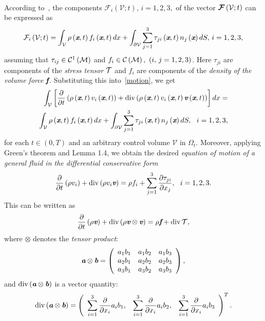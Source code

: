 \paragraph{}
According to~\cite{1993}, the components $\mathcal{F}_i\left(\mathcal{V};t\right),\,i=1, 2, 3,$ of the vector $\boldsymbol{\mathcal{F}}\left(\mathcal{V};t\right)$ can be expressed as
\begin{equation}
\mathcal{F}_i\left(\mathcal{V};t\right) = \int_{\mathcal{V}}\rho\left(\textit{\textbf{x}},t\right)f_i\left(\textit{\textbf{x}},t\right)dx + \int_{\partial\mathcal{V}}\sum_{j=1}^3\tau_{ji}\left(\textit{\textbf{x}},t\right)n_j\left(\textit{\textbf{x}}\right)dS,\,i = 1,2,3,
\end{equation}
assuming that $\tau_{ij}\in\mathcal{C}^1\left({}\mathcal{M}\right) $ and $f_i\in\mathcal{C}\left({}\mathcal{M}\right),\ \left({}i,\,j=1, 2, 3\right) $. Here $\tau_{ji}$ are components of the \textit{stress tensor} $\mathcal{T}$ and $f_i$ are components of the \textit{density of the volume force} $\textit{\textbf{f}}$.
Substituting this into~\eqref{motion},
we get
\begin{eqnarray}
\int_{\mathcal{V}}\left[\pds{}{t}\left(\rho\left(\bs{x},t\right)v_i\left(\bs{x},t\right)\right)+\mathrm{div}\left(\rho\left(\bs{x},t\right)v_i\left(\bs{x},t\right)\bs{v}\left(\bs{x},t\right)\right)\right]dx= \\
\int_{\mathcal{V}}\rho\left(\bs{x},t\right)f_i\left(\bs{x},t\right)dx + \int_{\partial\mathcal{V}}\sum_{j=1}^3\tau_{ji}\left(\bs{x},t\right)n_j\left(\bs{x}\right)dS,\ \ i = 1,2,3,
\end{eqnarray}
for each $t\in\left(0,T\right)$ and an arbitrary control volume $\mathcal{V}$ in $\Omega_t$.
Moreover, applying Green's theorem and Lemma 1.4, we obtain the desired \textit{equation of motion of a general fluid in the differential conservative form}
\begin{equation}
 \frac{\partial{}}{\partial{t}}\left(\rho{v_i}\right)+\mathrm{div}\left(\rho{v_i}\textit{\textbf{v}}\right)=\rho{f_i} + \sum_{j=1}^3\frac{\partial{\tau_{ji}}}{\partial{x_j}},\ \ i = 1, 2, 3.
\end{equation}
This can be written as 
\begin{equation}\label{general motion}
 \frac{\partial{}}{\partial{t}}\left(\rho\textit{\textbf{v}}\right)+\mathrm{div}\left(\rho\textit{\textbf{v}}\otimes\textit{\textbf{v}}\right) = \rho\textit{\textbf{f}}+\mathrm{div}\,\mathcal{T},
\end{equation}
where $\otimes$ denotes the \textit{tensor product}:
\begin{displaymath}
\textit{\textbf{a}}\otimes\textit{\textbf{b}} =
\left(
\begin{array}{ccc}
a_1b_1 & a_1b_2 & a_1b_3 \\
a_2b_1 & a_2b_2 & a_2b_3 \\
a_3b_1 & a_3b_2 & a_3b_3
\end{array}
\right),
\end{displaymath}
and 
$\mathrm{div}\left(\textit{\textbf{a}}\otimes\textit{\textbf{b}}\right)$ is a vector quantity:
\begin{displaymath}
\mathrm{div}\left(\textit{\textbf{a}}\otimes\textit{\textbf{b}}\right)=
\left(
\begin{array}{ccc}
\displaystyle\sum_{i=1}^{3}\frac{\partial{}}{\partial{x_i}}a_ib_1, & \displaystyle\sum_{i=1}^{3}\frac{\partial{}}{\partial{x_i}}a_ib_2, & \displaystyle\sum_{i=1}^{3}\frac{\partial{}}{\partial{x_i}}a_ib_3
\end{array}
\right)
^T.
\end{displaymath}
